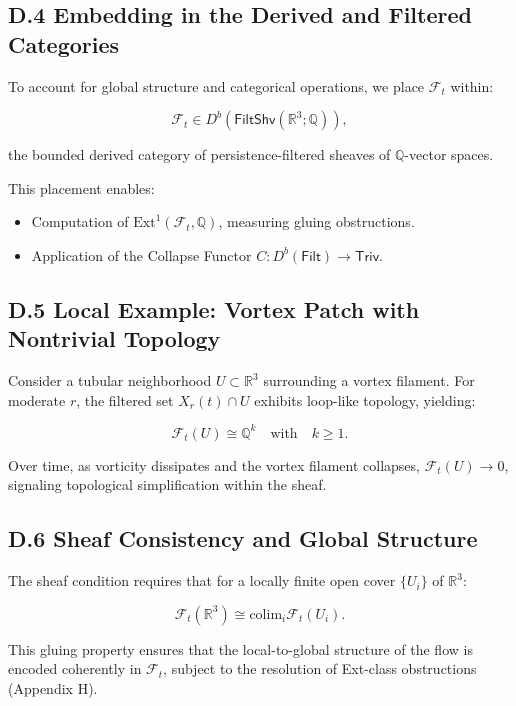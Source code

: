 \documentclass[11pt]{article}
\begin{document}
\subsection*{D.4 Embedding in the Derived and Filtered Categories}

To account for global structure and categorical operations, we place \( \mathcal{F}_t \) within:

\[
\mathcal{F}_t \in D^b(\mathsf{FiltShv}(\mathbb{R}^3; \mathbb{Q})),
\]

the bounded derived category of persistence-filtered sheaves of \( \mathbb{Q} \)-vector spaces.

This placement enables:

\begin{itemize}
  \item Computation of \( \mathrm{Ext}^1(\mathcal{F}_t, \mathbb{Q}) \), measuring gluing obstructions.
  \item Application of the Collapse Functor \( C: D^b(\mathsf{Filt}) \to \mathsf{Triv} \).
\end{itemize}

\subsection*{D.5 Local Example: Vortex Patch with Nontrivial Topology}

Consider a tubular neighborhood \( U \subset \mathbb{R}^3 \) surrounding a vortex filament. For moderate \( r \), the filtered set \( X_r(t) \cap U \) exhibits loop-like topology, yielding:

\[
\mathcal{F}_t(U) \cong \mathbb{Q}^k \quad \text{with} \quad k \geq 1.
\]

Over time, as vorticity dissipates and the vortex filament collapses, \( \mathcal{F}_t(U) \to 0 \), signaling topological simplification within the sheaf.

\subsection*{D.6 Sheaf Consistency and Global Structure}

The sheaf condition requires that for a locally finite open cover \( \{ U_i \} \) of \( \mathbb{R}^3 \):

\[
\mathcal{F}_t(\mathbb{R}^3) \cong \mathrm{colim}_i \mathcal{F}_t(U_i).
\]

This gluing property ensures that the local-to-global structure of the flow is encoded coherently in \( \mathcal{F}_t \), subject to the resolution of Ext-class obstructions (Appendix H).
\end{document}
